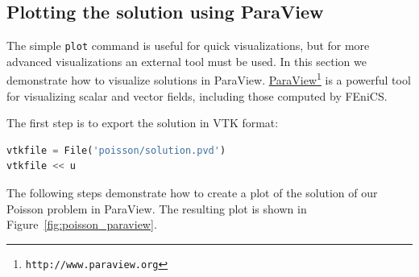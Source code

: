 \documentclass[graybox,envcountchap,sectrefs,final]{svmonodo}
\begin{document}
\subsection{Plotting the solution using ParaView}


The simple \texttt{plot} command is useful for quick visualizations, but for
more advanced visualizations an external tool must be used. In this
section we demonstrate how to visualize solutions in ParaView.
\href{{http://www.paraview.org}}{ParaView}\footnote{\texttt{http://www.paraview.org}} is a powerful
tool for visualizing scalar and vector fields, including those
computed by FEniCS.

The first step is to export the solution in VTK format:

\begin{lstlisting}[language=Python,style=graycolor]
vtkfile = File('poisson/solution.pvd')
vtkfile << u
\end{lstlisting}
The following steps demonstrate how to create a plot of the solution
of our Poisson problem in ParaView. The resulting plot is shown in
Figure~\ref{fig:poisson_paraview}.
\end{document}
